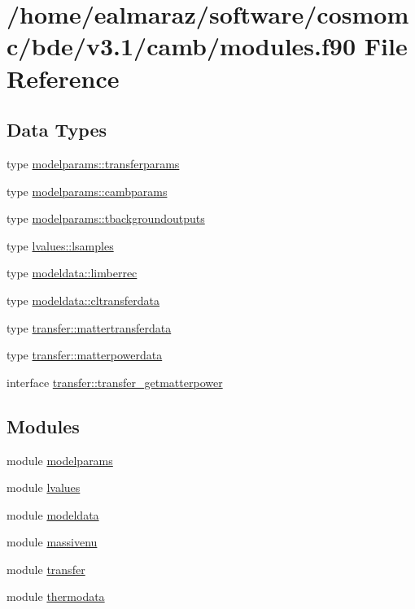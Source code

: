 \hypertarget{modules_8f90}{}\section{/home/ealmaraz/software/cosmomc/bde/v3.1/camb/modules.f90 File Reference}
\label{modules_8f90}
\subsection*{Data Types}
\begin{DoxyCompactItemize}
\item 
type \mbox{\hyperlink{structmodelparams_1_1transferparams}{modelparams\+::transferparams}}
\item 
type \mbox{\hyperlink{structmodelparams_1_1cambparams}{modelparams\+::cambparams}}
\item 
type \mbox{\hyperlink{structmodelparams_1_1tbackgroundoutputs}{modelparams\+::tbackgroundoutputs}}
\item 
type \mbox{\hyperlink{structlvalues_1_1lsamples}{lvalues\+::lsamples}}
\item 
type \mbox{\hyperlink{structmodeldata_1_1limberrec}{modeldata\+::limberrec}}
\item 
type \mbox{\hyperlink{structmodeldata_1_1cltransferdata}{modeldata\+::cltransferdata}}
\item 
type \mbox{\hyperlink{structtransfer_1_1mattertransferdata}{transfer\+::mattertransferdata}}
\item 
type \mbox{\hyperlink{structtransfer_1_1matterpowerdata}{transfer\+::matterpowerdata}}
\item 
interface \mbox{\hyperlink{interfacetransfer_1_1transfer__getmatterpower}{transfer\+::transfer\+\_\+getmatterpower}}
\end{DoxyCompactItemize}
\subsection*{Modules}
\begin{DoxyCompactItemize}
\item 
module \mbox{\hyperlink{namespacemodelparams}{modelparams}}
\item 
module \mbox{\hyperlink{namespacelvalues}{lvalues}}
\item 
module \mbox{\hyperlink{namespacemodeldata}{modeldata}}
\item 
module \mbox{\hyperlink{namespacemassivenu}{massivenu}}
\item 
module \mbox{\hyperlink{namespacetransfer}{transfer}}
\item 
module \mbox{\hyperlink{namespacethermodata}{thermodata}}
\end{DoxyCompactItemize}
